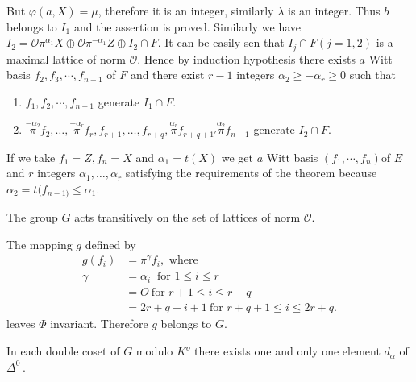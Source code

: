 But  $\varphi (a,X) = \mu$, therefore it is an integer,
similarly $\lambda $ is an integer. Thus $b$ belongs to $I_1$ and the
assertion is proved. Similarly   we have $ I_2 = \mathscr{O} \pi
^{\alpha_1} X \oplus \mathscr{O} \pi ^{-\alpha _1}Z \oplus I_2 \cap
F$. It can be easily sen that $ I_j \cap F(j=1,2)$ is a maximal
lattice of norm $\mathscr{O} $. Hence by induction hypothesis there
exists $a$ Witt basis $f_2, f_3, \cdots, f_{n-1}$ of $F$ and there
exist $r-1$ integers $\alpha _2 \ge - \alpha _r \ge 0$ such that
\begin{enumerate}[(1)]
\item $f_1, f_2, \cdots,  f_{n-1}$ generate $I_1 \cap F$.
\item $\overset{-\alpha_2}{\pi}  f_2,
  \ldots,\overset{-\alpha_r}{\pi} f_r, f_{r+1}, \ldots,
  f_{r+q}, \overset{\alpha_r}{\pi} f_{r+q+1'} \overset{\alpha_2}{\pi}
  f_{n-1}$ generate $ I_2\cap F$.
\end{enumerate}
If we take $f_1=  Z,  f_n= X$ and $\alpha _1 = t(X)$   we get $a$ Witt
basis 
$(f_1, \cdots,  f_n )$\pageoriginale of $E$ and $r$ integers $\alpha  _1,\ldots, 
\alpha _r$ satisfying the requirements of the theorem because 
$\alpha _2 = t(f_{n-1)} \leq \alpha_1$. 
\begin{corollary}
The group $G$ acts transitively on the set of lattices of norm
$\mathscr{O}$. 
\end{corollary}

The mapping $g$ defined by 
\begin{align*}
  g(f_i) &= \pi^ \gamma f_i, \text{ where }\\
  \gamma &= \alpha _i ~\text{ for } 1 \leq i \leq r\\
  &= O ~\text{for } r+1 \leq i \leq r+q \\
  &=2r+q-i+1~ \text {for } r+q+1 \leq i \leq 2r+q.
\end{align*}
leaves $\Phi$ invariant. Therefore $g$ belongs to $G$. 

\begin{proposition}\label{part2:chap2:sec3:prop6}
  In each double coset of $G$  modulo $K^o$ there exists one and only
  one element $d_\alpha$ of $\Delta^0_+$. 
\end{proposition}

